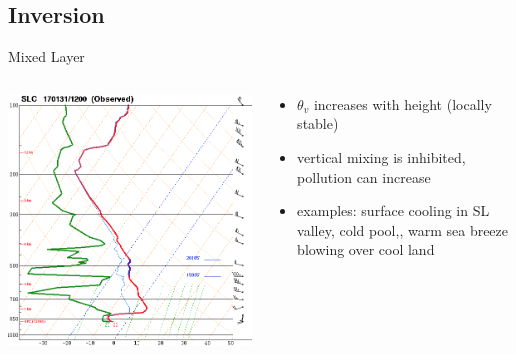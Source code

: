\subsection{Inversion}
\begin{frame}{Mixed Layer}
\begin{columns}[T]
    \begin{column}{.5\textwidth}
    \begin{minipage}[c][0.7\textheight][c]{\linewidth}
    \includegraphics[width=1\textwidth]{fig13}\\
    \end{minipage}
    \end{column}
    \begin{column}{.6\textwidth}
    \begin{minipage}[c][0.6\textheight][c]{\linewidth}
   \begin{itemize}
   	\item $\theta_v$ increases with height (locally stable)
   	\item vertical mixing is inhibited, pollution can increase
   	\item examples: surface cooling in SL valley, cold pool,, warm sea breeze blowing over cool land
   	\end{itemize}
      \end{minipage}
    \end{column}
  \end{columns}
\end{frame}
